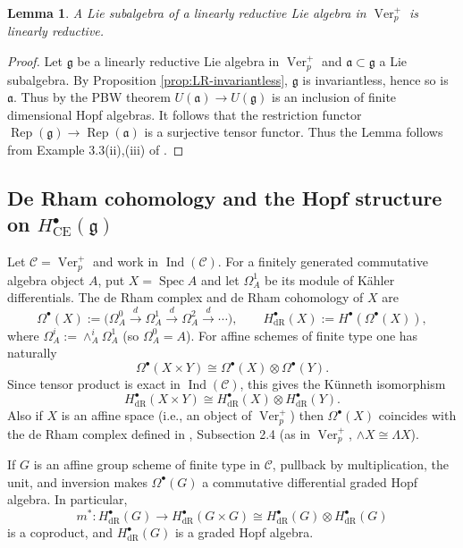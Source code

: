 \documentclass[12pt]{amsart}
\newtheorem{lemma}[theorem]{Lemma}
\theoremstyle{remark}
\DeclareMathOperator{\Ver}{Ver}
\DeclareMathOperator{\Rep}{Rep}
\newcommand{\cC}{\mathcal C}
\newcommand{\g}{\mathfrak g}
\newcommand{\CE}{\mathrm{CE}}
\newcommand{\dR}{\mathrm{dR}}
\begin{document}
\begin{lemma}\label{subal} A Lie subalgebra of a linearly reductive Lie algebra in $\Ver_p^+$ is linearly reductive.
\end{lemma} 

\begin{proof} Let $\g$ be a linearly reductive Lie algebra in $\Ver_p^+$ and 
$\mathfrak{a}\subset \g$ a Lie subalgebra. By Proposition \ref{prop:LR-invariantless},
$\g$ is invariantless, hence so is $\mathfrak{a}$. Thus by the PBW theorem 
$U(\mathfrak{a})\to U(\g)$ is an inclusion of finite dimensional Hopf algebras. 
It follows that the restriction functor $\Rep(\g)\to \Rep(\mathfrak{a})$ 
is a surjective tensor functor. Thus the Lemma follows from 
Example 3.3(ii),(iii) of \cite{EO04}.
\end{proof} 

\subsection{De Rham cohomology and the Hopf structure on
\texorpdfstring{$H^\bullet_{\CE}(\g)$}{CE cohomology}}
\label{sec:de-rham}

Let $\cC=\Ver_p^+$ and work in $\operatorname{Ind}(\cC)$.  For a finitely
generated commutative algebra object $A$, put $X=\operatorname{Spec}A$ and
let $\Omega_A^1$ be its module of K\"ahler differentials.  The de Rham
complex and de Rham cohomology of $X$ are
\[
 \Omega^\bullet(X):=
 \bigl(\Omega_A^0\xrightarrow{d}\Omega_A^1\xrightarrow{d}
 \Omega_A^2\xrightarrow{d}\cdots\bigr),
 \qquad
 H^\bullet_{\dR}(X):=H^\bullet(\Omega^\bullet(X)),
\]
where $\Omega_A^i:=\wedge_A^i\Omega_A^1$ (so $\Omega_A^0=A$). 
For affine schemes of finite type one has naturally
\[
 \Omega^\bullet(X\times Y)
 \cong \Omega^\bullet(X)\otimes\Omega^\bullet(Y).
\]
Since tensor product is exact in $\operatorname{Ind}(\cC)$, this gives the
K\"unneth isomorphism
\[
 H^\bullet_{\dR}(X\times Y)
 \cong H^\bullet_{\dR}(X)\otimes H^\bullet_{\dR}(Y).
\]
Also if $X$ is an affine space (i.e., an object of $\Ver_p^+$) then $\Omega^\bullet(X)$ coincides with the de Rham complex defined in \cite{Eti18}, Subsection 2.4 (as in $\Ver_p^+$, $\wedge X\cong \Lambda X$).

If $G$ is an affine group scheme of finite type in $\cC$, pullback by
multiplication, the unit, and inversion makes $\Omega^\bullet(G)$ a
commutative differential graded Hopf algebra.  In particular,
\[
 m^*:H^\bullet_{\dR}(G)
 \longrightarrow H^\bullet_{\dR}(G\times G)
 \cong H^\bullet_{\dR}(G)\otimes H^\bullet_{\dR}(G)
\]
is a coproduct, and $H^\bullet_{\dR}(G)$ is a graded Hopf algebra.
\end{document}
